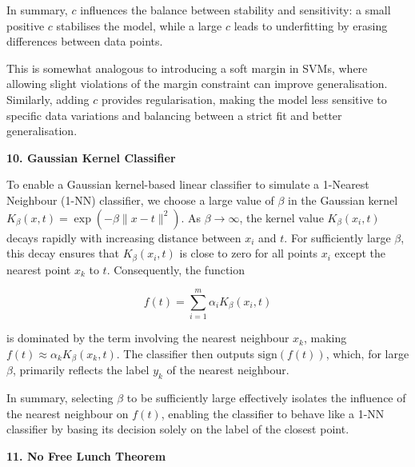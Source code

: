 \documentclass{article}
\begin{document}
\begin{itemize}
    In summary, \( c \) influences the balance between stability and sensitivity: a small positive \( c \) stabilises the model, while a large \( c \) leads to underfitting by erasing differences between data points.

    This is somewhat analogous to introducing a soft margin in SVMs, where allowing slight violations of the margin constraint can improve generalisation. Similarly, adding \( c \) provides regularisation, making the model less sensitive to specific data variations and balancing between a strict fit and better generalisation.

\end{itemize}
\vspace{0.5cm}

\vspace{0.5cm}
\noindent\textbf{10. Gaussian Kernel Classifier}
\vspace{0.5cm}


\begin{itemize}
    To enable a Gaussian kernel-based linear classifier to simulate a 1-Nearest Neighbour (1-NN) classifier, we choose a large value of \(\beta\) in the Gaussian kernel \( K_\beta(x, t) = \exp(-\beta \| x - t \|^2) \). As \(\beta \to \infty\), the kernel value \( K_\beta(x_i, t) \) decays rapidly with increasing distance between \( x_i \) and \( t \). For sufficiently large \(\beta\), this decay ensures that \( K_\beta(x_i, t) \) is close to zero for all points \( x_i \) except the nearest point \( x_k \) to \( t \). Consequently, the function
    
    \[
    f(t) = \sum_{i=1}^m \alpha_i K_\beta(x_i, t)
    \]
    
    is dominated by the term involving the nearest neighbour \( x_k \), making \( f(t) \approx \alpha_k K_\beta(x_k, t) \). The classifier then outputs \( \text{sign}(f(t)) \), which, for large \(\beta\), primarily reflects the label \( y_k \) of the nearest neighbour.
    
    In summary, selecting \(\beta\) to be sufficiently large effectively isolates the influence of the nearest neighbour on \( f(t) \), enabling the classifier to behave like a 1-NN classifier by basing its decision solely on the label of the closest point.
\end{itemize}

\vspace{0.5cm}

\vspace{0.5cm}
\noindent\textbf{11. No Free Lunch Theorem}
\vspace{0.5cm}
\end{document}
